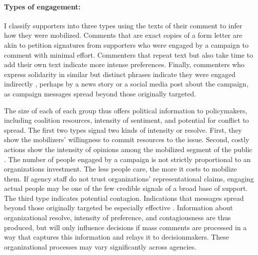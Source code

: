 \paragraph{Types of engagement:} I classify supporters into three types using the texts of their comment to infer how they were mobilized.  Comments that are exact copies of a form letter are akin to petition signatures from supporters who were engaged by a campaign to comment with minimal effort. Commenters that repeat text but also take time to add their own text indicate more intense preferences. Finally, commenters who express solidarity in similar but distinct phrases indicate they were engaged indirectly
, perhaps by a news story or a social media post about the campaign, 
as campaign messages spread beyond those originally targeted. 

The size of each of each group thus offers political information to policymakers, including coalition resources, intensity of sentiment, and potential for conflict to spread.
The first two types signal two kinds of intensity or resolve. First, they show the mobilizers' willingness to commit resources to the issue. Second, costly actions show the intensity of opinions among the mobilized segment of the public \citep{Dunleavy1991}. The number of people engaged by a campaign is not strictly proportional to an organizations investment. The less people care, the more it costs to mobilize them. If agency staff do not trust organizations' representational claims, engaging actual people may be one of the few credible signals of a broad base of support. The third type indicates potential contagion. Indications that messages spread beyond those originally targeted be especially effective \citep{Kollman1998}. Information about organizational resolve, intensity of preference, and contagiousness are thus produced, but will only influence decisions if mass comments are processed in a way that captures this information and relays it to decisionmakers. These organizational processes may vary significantly across agencies.

